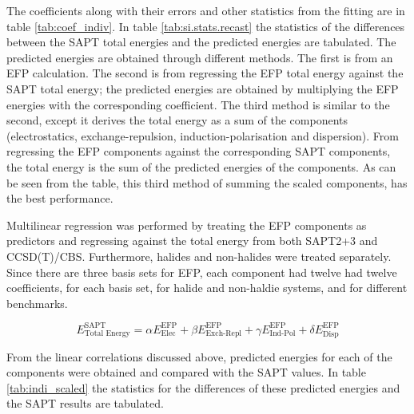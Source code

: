 \begin{multicols}{2}

The coefficients along with their errors and other statistics from the fitting are in table 
\ref{tab:coef_indiv}.
In table 
\ref{tab:si.stats.recast}
the statistics of the differences between the SAPT total energies and the predicted energies are tabulated.
The predicted energies are obtained through different methods. 
The first is from an EFP calculation.
The second is from regressing the EFP total energy against the SAPT total energy; the predicted energies are obtained by multiplying the EFP energies with the corresponding coefficient.
The third method is similar to the second, except it derives the total energy as a sum of the components (electrostatics, exchange-repulsion, induction-polarisation and dispersion).
From regressing the EFP components against the corresponding SAPT components, the total energy is the sum of the predicted energies of the components.
As can be seen from the table, this third method of summing the scaled components, has the best performance.



Multilinear regression was performed by treating the EFP components as predictors and regressing against the total energy from both SAPT2+3 and CCSD(T)/CBS.
Furthermore, halides and non-halides were treated separately.
Since there are three basis sets for EFP, each component had twelve had twelve coefficients, for each basis set, for halide and non-haldie systems, and for different benchmarks.


\begin{equation}
    E^{\text{SAPT}}_{\text{Total Energy}} = \alpha E_{\text{Elec}}^{\text{EFP}} +
                                            \beta E_{\text{Exch-Repl}}^{\text{EFP}} +
                                            \gamma E_{\text{Ind-Pol}}^{\text{EFP}} +
                                            \delta E_{\text{Disp}}^{\text{EFP}}
\end{equation}

From the linear correlations discussed above, predicted energies for each of the components were obtained and compared with the SAPT values. 
In table 
\ref{tab:indi_scaled}
the statistics for the differences of these predicted energies and the SAPT results are tabulated. 
\end{multicols}

